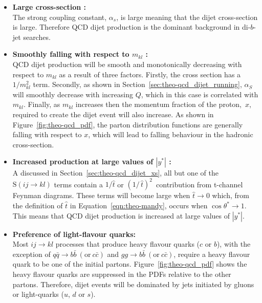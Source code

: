 \begin{itemize}[leftmargin=*]
\item\textbf{Large cross-section :}\\
  The strong coupling constant, $\alpha_s$, is large meaning that the dijet cross-section is large.
  Therefore QCD dijet production is the dominant background in di-$b$-jet searches.\vspace{0.5em}
  
\item\textbf{Smoothly falling with respect to $m_{kl}$ :}\\
  QCD dijet production will be smooth and monotonically decreasing
  with respect to $m_{kl}$ as a result of three factors.
  Firstly, the cross section has a $1/m_{kl}^{2}$ term.
  Secondly, as shown in Section~\ref{sec:theo-qcd_dijet_running},
  $\alpha_S$ will smoothly decrease with increasing $Q$, which in this case is correlated with $m_{kl}$.
  Finally, as $m_{kl}$ increases then the momentum fraction of the \mbox{proton, $x$,} required to create
  the dijet event will also increase.
  As shown in Figure~\ref{fig:theo-qcd_pdf}, the parton distribution functions are generally falling 
  with respect to $x$, which will lead to falling behaviour in the hadronic cross-section.
  \vspace{0.5em}
  
\item\textbf{Increased production at large values of $|y^*|$ :}\\
  A discussed in Section~\ref{sec:theo-qcd_dijet_xs}, all but one of the $\text{S}(ij \to kl)$ terms
  contain a $1/\hat{t}$ or $(1/\,\hat{t})^2\,$ contribution from t-channel Feynman diagrams.
  These terms will become large when $\hat{t} \to 0$ which, from the definition of $\hat{t}$ in Equation~\ref{eqn:theo-mandy},
  occurs when $\cos{\theta^*} \to 1$.
  This means that QCD dijet production is increased at large values of $|y^*|$.
  \vspace{0.5em}
  
\item\textbf{Preference of light-flavour quarks:}\\
  Most $ij \to kl$ processes that produce heavy flavour quarks ($c$ or $b$),
  with the exception of $q \bar{q} \to b\bar{b} \ (\text{or}\ c\bar{c})$ and $g g \to b\bar{b} \ (\text{or}\ c\bar{c})$,
  require a heavy flavour quark to be one of the initial partons.
  Figure~\ref{fig:theo-qcd_pdf} shows the heavy flavour quarks are suppressed in the PDFs relative to the other partons.
  Therefore, dijet events will be dominated by jets initiated by gluons or light-quarks ($u$, $d$ or $s$).
 
\end{itemize}

